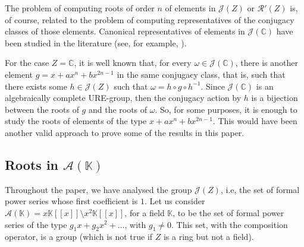 \documentclass[preprint,12pt]{elsarticle}
\begin{document}
The problem of computing roots of order $n$ of elements in $\mathcal J(Z)$ or $\mathcal R'(Z)$ is, of course, related to the problem of computing representatives of the conjugacy classes of those elements. Canonical representatives of elements in $\mathcal J(\mathbb C)$ have been studied in the literature (see, for example, \cite{B,CPT,Mu,Sc}).

For the case $Z=\mathbb C$, it is well known that, for every $\omega\in\mathcal J(\mathbb C)$, there is another element $g=x+a x^n+bx^{2n-1}$ in the same conjugacy class, that is, such that there exists some $h\in\mathcal J(Z)$ such that $\omega=h\circ g\circ h^{-1}$. Since $\mathcal J(\mathbb C)$ is an algebraically complete URE-group, then the conjugacy action by $h$ is a bijection between the roots of $g$ and the roots of $\omega$. So, for some purposes, it is enough to study the roots of elements of the type $x+a x^n+bx^{2n-1}$. This would have been another valid approach to prove some of the results in this paper.












\subsection{Roots in \texorpdfstring{$\mathcal A(\mathbb K)$}{A(K)}}
Throughout the paper, we have analysed the group $\mathcal J(Z)$, i.e, the set of formal power series whose first coefficient is $1$. Let us consider $\mathcal A(\mathbb K) = x\mathbb{K}[[x]]\setminus x^2 \mathbb{K}[[x]] $, for a field $\mathbb K$, to be the set of formal power series of the type $g_1x+g_2x^2+\ldots$, with $g_1\neq 0$. This set, with the composition operator, is a group (which is not true if $Z$ is a ring but not a field). 

\end{document}
